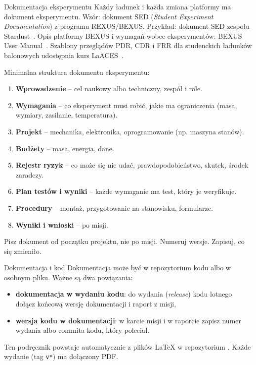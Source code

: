\begin{sekcja}{Dokumentacja eksperymentu}
Każdy ładunek i każda zmiana platformy ma dokument eksperymentu. Wzór: dokument SED (\emph{Student Experiment Documentation}) z programu REXUS/BEXUS. Przykład: dokument SED zespołu Stardust~\cite{sed}. Opis platformy BEXUS i wymagań wobec eksperymentów: BEXUS User Manual~\cite{bexusmanual}. Szablony przeglądów PDR, CDR i FRR dla studenckich ładunków balonowych udostępnia kurs LaACES~\cite{laaces}.

Minimalna struktura dokumentu eksperymentu:
\begin{enumerate}
  \item \textbf{Wprowadzenie} -- cel naukowy albo techniczny, zespół i role.
  \item \textbf{Wymagania} -- co eksperyment musi robić, jakie ma ograniczenia (masa, wymiary, zasilanie, temperatura).
  \item \textbf{Projekt} -- mechanika, elektronika, oprogramowanie (np. maszyna stanów).
  \item \textbf{Budżety} -- masa, energia, dane.
  \item \textbf{Rejestr ryzyk} -- co może się nie udać, prawdopodobieństwo, skutek, środek zaradczy.
  \item \textbf{Plan testów i wyniki} -- każde wymaganie ma test, który je weryfikuje.
  \item \textbf{Procedury} -- montaż, przygotowanie na stanowisku, formularze.
  \item \textbf{Wyniki i wnioski} -- po misji.
\end{enumerate}

Pisz dokument od początku projektu, nie po misji. Numeruj wersje. Zapisuj, co się zmieniło.
\end{sekcja}

\begin{podsekcja}{Dokumentacja i kod}
Dokumentacja może być w repozytorium kodu albo w osobnym pliku. Ważne są dwa powiązania:
\begin{itemize}
  \item \textbf{dokumentacja w wydaniu kodu}: do wydania (\emph{release}) kodu lotnego dołącz końcową wersję dokumentacji i raport z misji,
  \item \textbf{wersja kodu w dokumentacji}: w karcie misji i w raporcie zapisz numer wydania albo commita kodu, który poleciał.
\end{itemize}
Ten podręcznik powstaje automatycznie z plików \LaTeX{} w repozytorium . Każde wydanie (tag \texttt{v*}) ma dołączony PDF.
\end{podsekcja}

